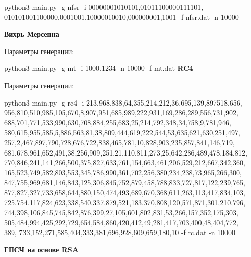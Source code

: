 \documentclass[spec, och, labwork]{shiza}
\begin{document}
  python3 main.py -g nfsr -i 00000001010101,01011100000111101,\\
  010101001100000,0001001,10000010010,000000001,1001 -f nfsr.dat 
  -n 10000
  \vspace{5mm}

 \textbf{Вихрь Мерсенна}

 Параметры генерации:
 
  python3 main.py -g mt -i 1000,1234 -n 10000 -f mt.dat
  \vspace{5mm}
 \textbf{RC4}

  Параметры генерации:
 
  python3 main.py -g rc4 -i 213,968,838,64,355,214,212,36,695,139,897518,656,\\
  956,810,510,985,105,670,8,907,951,685,989,222,931,169,286,289,556,731,902,\\
  688,701,771,533,990,630,708,884,255,683,25,214,792,348,34,758,9,781,946,\\
  580,615,955,585,5,886,563,81,38,809,444,619,222,544,53,635,621,630,251,497,\\
  257,2,467,897,790,728,676,722,838,465,781,10,828,903,235,857,841,146,719,\\
  681,678,961,652,491,38,256,909,251,21,110,811,273,25,642,286,489,478,184,812,\\
  770,846,241,141,266,500,375,827,633,761,154,663,461,206,529,212,667,342,360,\\
  165,523,749,582,803,553,345,786,990,361,702,256,380,234,238,73,965,266,300,\\
  847,755,969,681,146,843,125,306,845,752,879,458,788,833,727,817,122,239,765,\\
  877,827,327,733,658,644,880,150,474,493,689,670,368,611,263,113,417,834,103,\\
  725,754,117,824,623,338,540,337,879,521,183,370,808,120,571,871,301,210,796,\\
  744,398,106,845,745,842,876,399,27,105,601,802,831,53,266,157,352,175,303,\\
  505,484,994,425,292,729,654,584,860,420,412,49,281,417,703,400,48,404,772,\\389,
  733,152,271,585,404,333,381,696,928,609,659,180,10 -f rc.dat -n 10000
  \vspace{5mm}

 \textbf{ГПСЧ на основе RSA}
\end{document}
